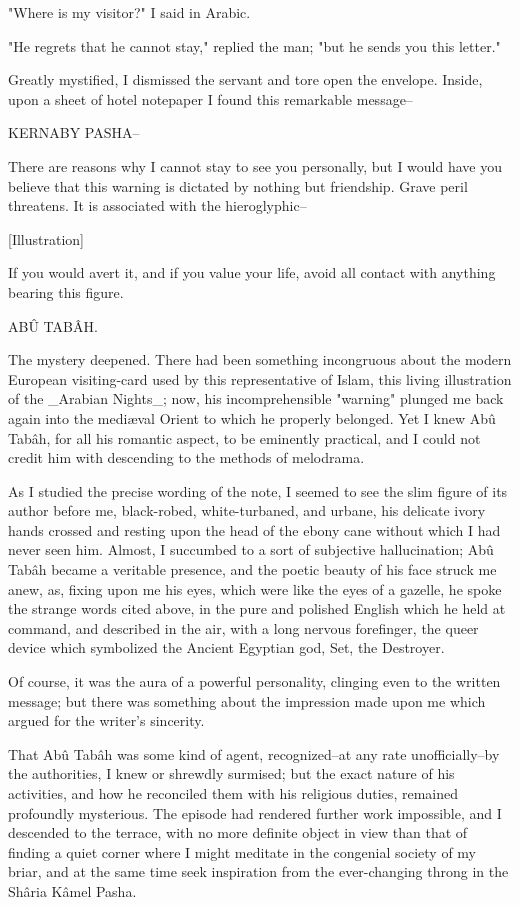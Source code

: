 "Where is my visitor?" I said in Arabic.

"He regrets that he cannot stay," replied the man; "but he sends you
this letter."

Greatly mystified, I dismissed the servant and tore open the envelope.
Inside, upon a sheet of hotel notepaper I found this remarkable
message--

  KERNABY PASHA--

  There are reasons why I cannot stay to see you personally, but I
  would have you believe that this warning is dictated by nothing
  but friendship. Grave peril threatens. It is associated with the
  hieroglyphic--

  [Illustration]

  If you would avert it, and if you value your life, avoid all contact
  with anything bearing this figure.

     ABÛ TABÂH.

The mystery deepened. There had been something incongruous about the
modern European visiting-card used by this representative of Islam,
this living illustration of the _Arabian Nights_; now, his
incomprehensible "warning" plunged me back again into the mediæval
Orient to which he properly belonged. Yet I knew Abû Tabâh, for all
his romantic aspect, to be eminently practical, and I could not credit
him with descending to the methods of melodrama.

As I studied the precise wording of the note, I seemed to see the slim
figure of its author before me, black-robed, white-turbaned, and
urbane, his delicate ivory hands crossed and resting upon the head of
the ebony cane without which I had never seen him. Almost, I succumbed
to a sort of subjective hallucination; Abû Tabâh became a veritable
presence, and the poetic beauty of his face struck me anew, as, fixing
upon me his eyes, which were like the eyes of a gazelle, he spoke the
strange words cited above, in the pure and polished English which he
held at command, and described in the air, with a long nervous
forefinger, the queer device which symbolized the Ancient Egyptian
god, Set, the Destroyer.

Of course, it was the aura of a powerful personality, clinging even to
the written message; but there was something about the impression made
upon me which argued for the writer's sincerity.

That Abû Tabâh was some kind of agent, recognized--at any rate
unofficially--by the authorities, I knew or shrewdly surmised; but the
exact nature of his activities, and how he reconciled them with his
religious duties, remained profoundly mysterious. The episode had
rendered further work impossible, and I descended to the terrace, with
no more definite object in view than that of finding a quiet corner
where I might meditate in the congenial society of my briar, and at
the same time seek inspiration from the ever-changing throng in the
Shâria Kâmel Pasha.

